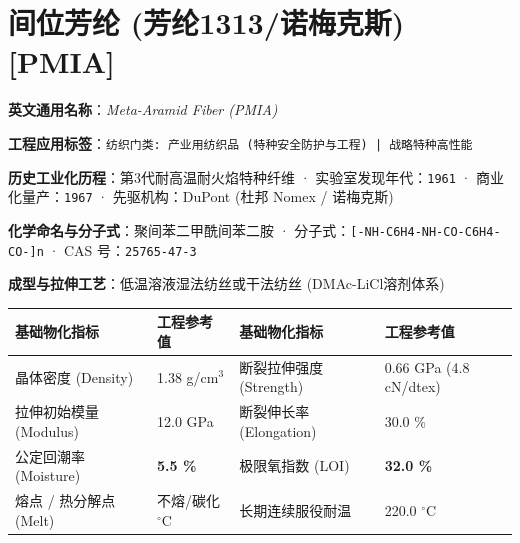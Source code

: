 \documentclass[11pt,openright,twoside,UTF8]{ctexbook}
\begin{document}
\section{间位芳纶 (芳纶1313/诺梅克斯) [PMIA]}
\label{sec:pmia}

\noindent\textbf{英文通用名称}：\textit{Meta-Aramid Fiber (PMIA)}\par
\noindent\textbf{工程应用标签}：\texttt{纺织门类: 产业用纺织品 (特种安全防护与工程) | 战略特种高性能}\par
\noindent\textbf{历史工业化历程}：第3代耐高温耐火焰特种纤维 · 实验室发现年代：\texttt{1961} · 商业化量产：\texttt{1967} · 先驱机构：DuPont (杜邦 Nomex / 诺梅克斯)\par
\noindent\textbf{化学命名与分子式}：聚间苯二甲酰间苯二胺 · 分子式：\texttt{[-NH-C6H4-NH-CO-C6H4-CO-]n} · CAS 号：\texttt{25765-47-3}\par
\noindent\textbf{成型与拉伸工艺}：低温溶液湿法纺丝或干法纺丝 (DMAc-LiCl溶剂体系)\par

\vspace{0.15cm}
\begin{center}
\small
\begin{tabularx}{\textwidth}{p{3.8cm}Xp{3.8cm}X}
\toprule
\textbf{基础物化指标} & \textbf{工程参考值} & \textbf{基础物化指标} & \textbf{工程参考值} \\
\midrule
晶体密度 (Density) & 1.38 g/cm$^3$ & 断裂拉伸强度 (Strength) & 0.66 GPa (4.8 cN/dtex) \\
拉伸初始模量 (Modulus) & 12.0 GPa & 断裂伸长率 (Elongation) & 30.0 \% \\
公定回潮率 (Moisture) & \textbf{5.5 \%} & 极限氧指数 (LOI) & \textbf{32.0 \%} \\
熔点 / 热分解点 (Melt) & 不熔/碳化 $^\circ\mathrm{C}$ & 长期连续服役耐温 & 220.0 $^\circ\mathrm{C}$ \\
\bottomrule
\end{tabularx}
\end{center}
\vspace{0.15cm}
\end{document}

